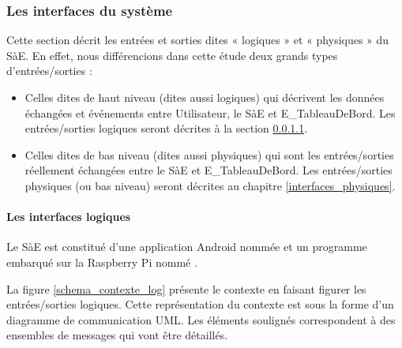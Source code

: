 \newpage
\subsubsection{Les interfaces du système}
Cette section décrit les entrées et sorties dites « logiques » et « physiques » du SàE.
En effet, nous différencions dans cette étude deux grands types d'entrées/sorties : 
\begin{itemize}
  \item Celles dites de haut niveau (dites aussi logiques) qui décrivent les données échangées et événements entre Utilisateur, le SàE et E\_TableauDeBord. Les entrées/sorties logiques seront décrites à la section \ref{interfaces_logiques}.
  \item Celles dites de bas niveau (dites aussi physiques) qui sont les entrées/sorties réellement échangées entre le SàE et E\_TableauDeBord. Les entrées/sorties physiques 
  (ou bas niveau) seront décrites au chapitre \ref{interfaces_physiques}.
\end{itemize}

\paragraph{Les interfaces logiques}
\label{interfaces_logiques}
Le SàE est constitué d'une application Android nommée {\nomApplication} et un programme embarqué sur la Raspberry Pi nommé {\nomLogiciel}. 

\vspace{6pt}

La figure \ref{schema_contexte_log} présente le contexte en faisant figurer les entrées/sorties logiques. Cette représentation du contexte est sous la forme d'un diagramme de communication UML. Les éléments soulignés correspondent à des ensembles de messages qui vont être détaillés. \\


